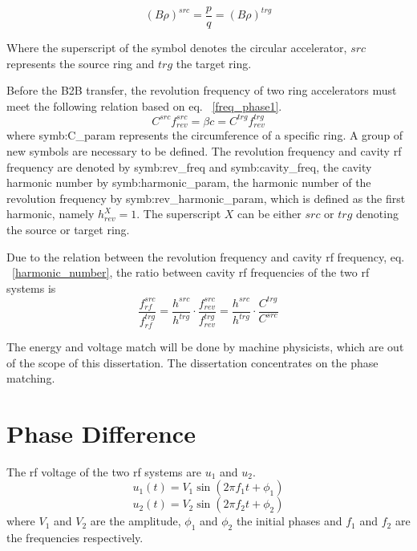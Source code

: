 \begin{equation}
	\label{eq:rigidity}
	(B\rho)^{\mathit{src}} =\frac{p}{q}=(B\rho)^{\mathit{trg}}
\end{equation}

Where the superscript of the symbol denotes the circular accelerator, $\mathit{src}$ represents the source ring and $\mathit{trg}$ the target ring. 

Before the B2B transfer, the revolution frequency of two ring accelerators must meet the following relation based on eq. ~\ref{freq_phase1}. 
\begin{equation}
	C^{\mathit{src}}f_{rev}^{\mathit{src}} = \beta c=C^{\mathit{trg}}f_{rev}^{\mathit{trg}}
\end{equation}
where \gls{symb:C_param} represents the circumference of a specific ring. A group of new symbols are necessary to be defined. The revolution frequency and cavity rf frequency are denoted by \gls{symb:rev_freq} and \gls{symb:cavity_freq}, the cavity harmonic number by \gls{symb:harmonic_param}, the harmonic number of the revolution frequency by \gls{symb:rev_harmonic_param}, which is defined as the first harmonic, namely $h_\mathit{rev}^\mathit{X}=1$. The superscript $X$ can be either $src$ or $trg$ denoting the source or target ring. 

Due to the relation between the revolution frequency and cavity rf frequency, eq. ~\ref{harmonic_number}, the ratio between cavity rf frequencies of the two rf systems is
\begin{equation}
	\frac{f_{rf}^{\mathit{src}}}{f_{rf}^{\mathit{trg}}}=\frac{h^{\mathit{src}}}{h^{\mathit{trg}}}\cdot\frac{f_{rev}^{\mathit{src}}}{f_{rev}^{\mathit{trg}}}=\frac{h^{\mathit{src}}}{h^{\mathit{trg}}}\cdot \frac{C^{\mathit{trg}}}{C^{\mathit{src}}}
\end{equation}

The energy and voltage match will be done by machine physicists, which are out of the scope of this dissertation. The dissertation concentrates on the phase matching.
\section{Phase Difference}
\label{match}
The rf voltage of the two rf systems are $u_1$ and $u_2$.
\begin{equation}
\label{rf_freq1}
	u_1(t)=V_1\sin(2\pi f_1t+\phi_1)
\end{equation}
\begin{equation}
\label{rf_freq2}
	u_2(t)=V_2\sin(2\pi f_2t+\phi_2)
\end{equation}
where $V_1$ and $V_2$ are the amplitude, $\phi_1$ and $\phi_2$ the initial phases and $f_1$ and $f_2$ are the frequencies respectively. 


